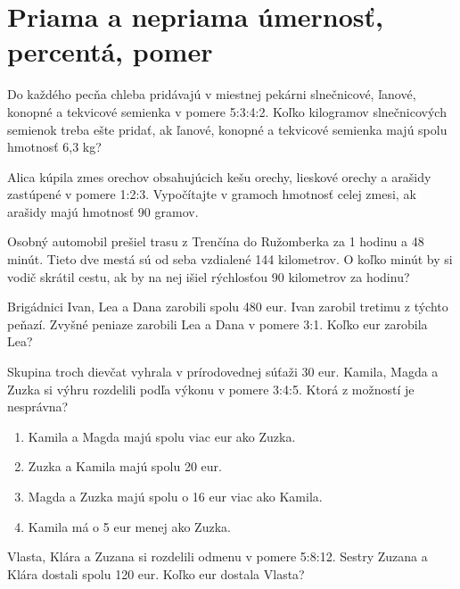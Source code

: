 \chapter{Priama a nepriama úmernosť, percentá, pomer}

\begin{example}
	Do každého pecňa chleba pridávajú v miestnej pekárni slnečnicové, ľanové, konopné a tekvicové semienka v pomere 5:3:4:2. Koľko kilogramov slnečnicových semienok treba ešte pridať, ak ľanové, konopné a tekvicové semienka majú spolu hmotnosť 6,3 kg?
\end{example}

\begin{example}
	Alica kúpila zmes orechov obsahujúcich kešu orechy, lieskové orechy a arašidy zastúpené v pomere 1:2:3. Vypočítajte v gramoch hmotnosť celej zmesi, ak arašidy majú hmotnosť 90 gramov.
\end{example}

\begin{example}
	Osobný automobil prešiel trasu z Trenčína do Ružomberka za 1 hodinu a 48 minút. Tieto dve mestá sú od seba vzdialené 144 kilometrov. O koľko minút by si vodič skrátil cestu, ak by na nej išiel rýchlosťou 90 kilometrov za hodinu?
\end{example}

\begin{example}
	Brigádnici Ivan, Lea a Dana zarobili spolu 480 eur. Ivan zarobil tretimu z týchto peňazí. Zvyšné peniaze zarobili Lea a Dana v pomere 3:1. Koľko eur zarobila Lea?
\end{example}


\begin{example}
	Skupina troch dievčat vyhrala v prírodovednej súťaži 30 eur. Kamila, Magda a Zuzka si výhru rozdelili podľa výkonu v pomere 3:4:5. Ktorá z možností je nesprávna?
	
	\begin{enumerate}
		\item Kamila a Magda majú spolu viac eur ako Zuzka.
		\item Zuzka a Kamila majú spolu 20 eur.
		\item Magda a Zuzka majú spolu o 16 eur viac ako Kamila.
		\item Kamila má o 5 eur menej ako Zuzka.
	\end{enumerate}
\end{example}

\begin{example}
	Vlasta, Klára a Zuzana si rozdelili odmenu v pomere 5:8:12. Sestry Zuzana a Klára dostali spolu 120 eur. Koľko eur dostala Vlasta?
\end{example}

